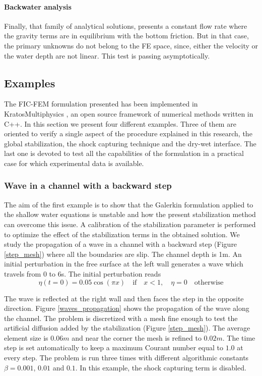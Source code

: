 \paragraph{Backwater analysis}
Finally, that family of analytical solutions, presents a constant flow rate where the gravity terms are in equilibrium with the bottom friction. But in that case, the primary unknowns do not belong to the FE space, since, either the velocity or the water depth are not linear. This test is passing asymptotically.


\subsection{Examples}
\label{sec:examples}

The FIC-FEM formulation presented has been implemented in KratosMultiphysics \cite{dadvand2010, dadvand2013}, an open source framework of numerical methods written in C++.
In this section we present four different examples. Three of them are oriented to verify a single aspect of the procedure explained in this research, the global stabilization, the shock capturing technique and the dry-wet interface.
The last one is devoted to test all the capabilities of the formulation in a practical case for which experimental data is available.


\subsubsection{Wave in a channel with a backward step}

The aim of the first example is to show that the Galerkin formulation applied to the shallow water equations is unstable and how the present stabilization method can overcome this issue. A calibration of the stabilization parameter is performed to optimize the effect of the stabilization terms in the obtained solution.
We study the propagation of a wave in a channel with a backward step (Figure \ref{step_mesh}) where all the boundaries are slip. The channel depth is 1m. An initial perturbation in the free surface at the left wall generates a wave which travels from 0 to 6s. The initial perturbation reads
\begin{equation}
\eta(t=0) = 0.05\cos(\pi x) \quad \text{if} \quad x<1, \quad \eta=0 \quad \text{otherwise}
\end{equation}


The wave is reflected at the right wall and then faces the step in the opposite direction.
Figure \ref{waves_propagation} shows the propagation of the wave along the channel.
The problem is discretized with a mesh fine enough to test the artificial diffusion added by the stabilization (Figure \ref{step_mesh}). The average element size is $0.06m$ and near the corner the mesh is refined to $0.02m$.
The time step is set automatically to keep a maximum Courant number equal to $1.0$ at every step. The problem is run three times with different algorithmic constants $\beta = 0.001$, $0.01$ and $0.1$. In this example, the shock capturing term is disabled.

